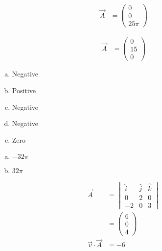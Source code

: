 \documentclass[10pt]{extarticle}
\begin{document}
  \begin{problem}{19.1}
    \begin{description}[font=\normalfont]
      \item[2:] 
        \begin{align*}
          \vec{A} &= \begin{pmatrix}0\\0\\25\pi\end{pmatrix}
        \end{align*}
      \item[4:]
        \begin{align*}
          \vec{A} &= \begin{pmatrix}0\\15\\0\end{pmatrix}
        \end{align*}
      \item[8:]
        \begin{enumerate}[(a)]
          \item Negative
          \item Positive
          \item Negative
          \item Negative
          \item Zero
        \end{enumerate}
      \item[12:]
        \begin{enumerate}[(a)]
          \item $-32\pi$
          \item $32\pi$
        \end{enumerate}
      \item[16:]
        \begin{align*}
          \vec{A} &= \begin{vmatrix}\hat{i} & \hat{j} & \hat{k} \\ 0 & 2 & 0 \\ -2 & 0 & 3\end{vmatrix}\\
                  &= \begin{pmatrix}6\\0\\4\end{pmatrix}\\
          \vec{v} \cdot \vec{A} &= -6
        \end{align*}
      \item[20:]

\end{description}
\end{problem}
\end{document}
